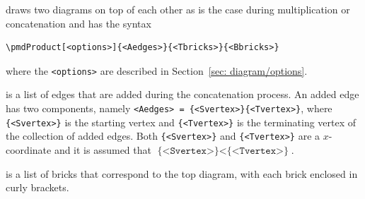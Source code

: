 \documentclass{ltxdoc}
\begin{document}
\DescribeMacro{\pmdProduct}
draws two diagrams on top of each other as is the case during multiplication or concatenation and has the syntax
\begin{verbatim}
\pmdProduct[<options>]{<Aedges>}{<Tbricks>}{<Bbricks>}
\end{verbatim}
where
the \texttt{<options>} are described in Section~\ref{sec: diagram/options}.

is a list of edges that are added during the concatenation process. An added edge has two components, namely \texttt{<Aedges>~=~\{<Svertex>\}\{<Tvertex>\}}, where \texttt{\{<Svertex>\}} is the starting vertex and \texttt{\{<Tvertex>\}} is the terminating vertex of the collection of added edges. Both \texttt{\{<Svertex>\}} and \texttt{\{<Tvertex>\}} are a \( x \)-coordinate and it is assumed that \( \texttt{\{<Svertex>\}} < \texttt{\{<Tvertex>\}} \).

is a list of bricks that correspond to the top diagram, with each brick enclosed in curly brackets.
\end{document}
